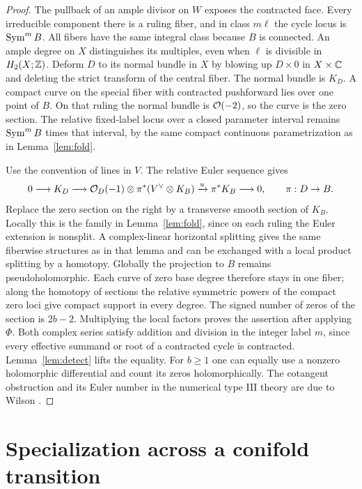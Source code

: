 \begin{proof}
The pullback of an ample divisor on $W$ exposes the contracted face.
Every irreducible component there is a ruling fiber, and in class
$m\ell$ the cycle locus is $\operatorname{Sym}^m B$. All fibers have the same
integral class because $B$ is connected. An ample degree on $X$
distinguishes its multiples, even when $\ell$ is divisible in
$H_2(X;\mathbb Z)$. Deform $D$ to its normal
bundle in $X$ by blowing up $D\times0$ in $X\times\mathbb C$ and deleting
the strict transform of the central fiber. The normal bundle is $K_D$.
A compact curve on the special fiber with contracted pushforward lies
over one point of $B$. On that ruling the normal bundle is $\mathcal O(-2)$,
so the curve is the zero section. The relative fixed-label locus over
a closed parameter interval remains $\operatorname{Sym}^m B$ times that interval,
by the same compact continuous parametrization as in Lemma~\ref{lem:fold}.

Use the convention of lines in $V$. The relative Euler sequence gives
\[
 0\longrightarrow K_D\longrightarrow
 \mathcal O_D(-1)\otimes\pi^*(V^\vee\otimes K_B)
 \xrightarrow{u}\pi^*K_B\longrightarrow0 ,
 \qquad \pi:D\to B.
\]
Replace the zero section on the right by a transverse smooth section
of $K_B$. Locally this is the family in Lemma~\ref{lem:fold}, since
on each ruling the Euler extension is nonsplit. A complex-linear
horizontal splitting gives the same fiberwise structures as in that
lemma and can be exchanged with a local product splitting by a homotopy.
Globally the projection to $B$ remains pseudoholomorphic. Each curve
of zero base degree therefore stays in one fiber; along the homotopy
of sections the relative symmetric powers of the compact zero loci
give compact support in every degree. The signed number of zeros of
the section is $2b-2$. Multiplying the local factors proves the assertion
after applying $\Phi$. Both complex series satisfy addition and
division in the integer label $m$, since every effective summand or
root of a contracted cycle is contracted. Lemma~\ref{lem:detect}
lifts the equality. For $b\ge1$ one can equally use a nonzero
holomorphic differential and count its zeros holomorphically.
The cotangent obstruction and its Euler number in the numerical
type III theory are due to Wilson \cite[\S4]{Wilson}.
\end{proof}

\section{Specialization across a conifold transition}\label{sec:transition}

